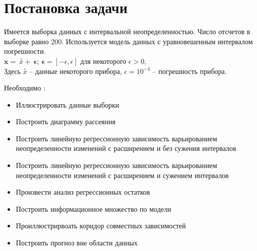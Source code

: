\documentclass[main.tex]{subfiles}
\begin{document}
  
\section{Постановка задачи}

Имеется выборка данных с интервальной неопределенностью. Число отсчетов в выборке равно 200. Используется модель данных с  уравновешенным интервалом погрешности. \\

$\bm{x} = \ \stackrel{\circ}{x} + \ \boldsymbol{\bm{\epsilon}}$; \quad $\boldsymbol{\bm{\epsilon}} = [-\epsilon, \epsilon]$  для некоторого $\epsilon >0 $, \\


Здесь $\stackrel{\circ}{x}$ -- данные некоторого прибора, $\epsilon = 10 ^ {-4}$ -- погрешность прибора.

Необходимо \cite{b:task}:
\begin{itemize}
	\item Иллюстрировать данные выборки
	\item Построить диаграмму рассеяния
	\item Построить линейную регрессионную зависимость варьированием неопределенности изменений с расширением и без сужения интервалов
	\item Построить линейную регрессионную зависимость варьированием неопределенности изменений с расширением и сужением интервалов
	\item Произвести анализ регрессионных остатков
	\item Построить информационное множество по модели
	\item Проиллюстрирвоать коридор совместных зависимостей
	\item Построить прогноз вне области данных
\end{itemize}


\newpage
\end{document}
